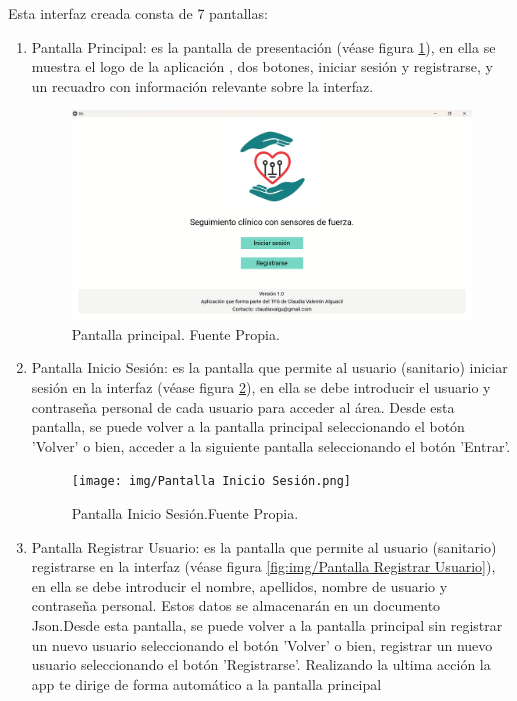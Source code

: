 Esta interfaz creada consta de 7 pantallas:
\begin{enumerate}
    \item Pantalla Principal: es la pantalla de presentación (véase figura \ref{fig:Pantalla principal}), en ella se muestra el logo de la aplicación , dos botones, iniciar sesión y registrarse, y un recuadro con información relevante sobre la interfaz.
    \begin{figure}
        \centering
        \includegraphics[width=1\linewidth]{img/Pantalla principal.png}
        \caption{Pantalla principal. Fuente Propia.}
        \label{fig:Pantalla principal}
    \end{figure}
    \item Pantalla Inicio Sesión: es la pantalla que permite al usuario (sanitario) iniciar sesión en la interfaz (véase figura \ref{fig:Pantalla Inicio Sesión}), en ella se debe introducir el usuario y contraseña personal de cada usuario para acceder al área. Desde esta pantalla, se puede volver a la pantalla principal seleccionando el botón 'Volver' o bien, acceder a la siguiente pantalla seleccionando el botón 'Entrar'.
\begin{figure}
    \centering
    \texttt{[image: img/Pantalla Inicio Sesión.png]}
    \caption{Pantalla Inicio Sesión.Fuente Propia.}
    \label{fig:Pantalla Inicio Sesión}
\end{figure}
    \item Pantalla Registrar Usuario: es la pantalla que permite al usuario (sanitario) registrarse en la interfaz (véase figura \ref{fig:img/Pantalla Registrar Usuario}), en ella se debe introducir el nombre, apellidos, nombre de usuario y contraseña personal. Estos datos se almacenarán en un documento Json.Desde esta pantalla, se puede volver a la pantalla principal sin registrar un nuevo usuario seleccionando el botón 'Volver' o bien, registrar un nuevo usuario seleccionando el botón 'Registrarse'. Realizando la ultima acción la app te dirige de forma automático a la pantalla principal

\end{enumerate}
